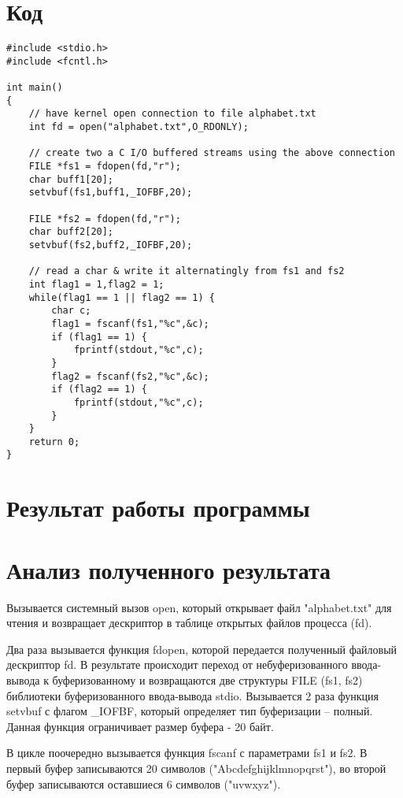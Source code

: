 \section{Код}
\begin{lstlisting}[caption={Программа 1}, label=lst:p1]
#include <stdio.h>
#include <fcntl.h>

int main()
{
	// have kernel open connection to file alphabet.txt
	int fd = open("alphabet.txt",O_RDONLY);
	
	// create two a C I/O buffered streams using the above connection 
	FILE *fs1 = fdopen(fd,"r");
	char buff1[20];
	setvbuf(fs1,buff1,_IOFBF,20);
	
	FILE *fs2 = fdopen(fd,"r");
	char buff2[20];
	setvbuf(fs2,buff2,_IOFBF,20);
	
	// read a char & write it alternatingly from fs1 and fs2
	int flag1 = 1,flag2 = 1;
	while(flag1 == 1 || flag2 == 1) {
		char c;
		flag1 = fscanf(fs1,"%c",&c);
		if (flag1 == 1) {
			fprintf(stdout,"%c",c);
		}
		flag2 = fscanf(fs2,"%c",&c);
		if (flag2 == 1) { 
			fprintf(stdout,"%c",c); 
		}
	}
	return 0;
}
\end{lstlisting}


\section{Результат работы программы}
\FloatBarrier
{}
\FloatBarrier

\section{Анализ полученного результата}
Вызывается системный вызов open, который открывает файл "alphabet.txt" для чтения и возвращает дескриптор в таблице открытых файлов процесса (fd). 

Два раза вызывается функция fdopen, которой передается полученный файловый дескриптор fd. В результате происходит переход от небуферизованного ввода-вывода к буферизованному и возвращаются две структуры FILE (fs1, fs2) библиотеки буферизованного ввода-вывода stdio. Вызывается 2 раза функция setvbuf с флагом \_IOFBF, который определяет тип буферизации -- полный. Данная функция ограничивает размер буфера - 20 байт.

В цикле поочередно вызывается функция fscanf с параметрами fs1 и fs2. В первый буфер записываются 20 символов ("Abcdefghijklmnopqrst"), во второй буфер записываются оставшиеся 6 символов ("uvwxyz").

